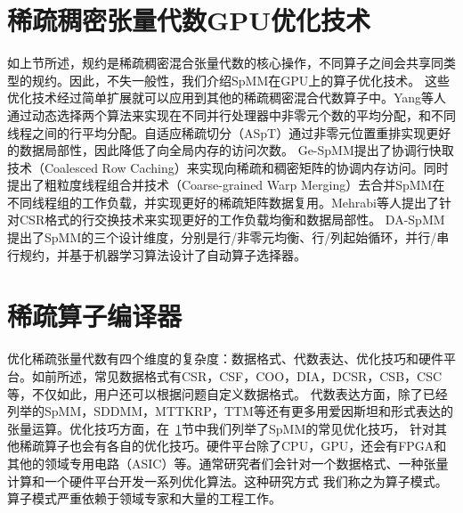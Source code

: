 \section{稀疏稠密张量代数GPU优化技术}\label{sec:spmmopt}
如上节所述，规约是稀疏稠密混合张量代数的核心操作，不同算子之间会共享同类型的规约。因此，不失一般性，我们介绍SpMM在GPU上的算子优化技术。
这些优化技术经过简单扩展就可以应用到其他的稀疏稠密混合代数算子中。Yang等人\cite{yang2018design}通过动态选择两个算法来实现在不同并行处理器中非零元个数的平均分配，和不同线程之间的行平均分配。自适应稀疏切分（ASpT）\cite{hong2019adaptive}通过非零元位置重排实现更好的数据局部性，因此降低了向全局内存的访问次数。
Ge-SpMM\cite{huang2020ge}提出了协调行快取技术（Coalesced Row Caching）来实现向稀疏和稠密矩阵的协调内存访问。同时提出了粗粒度线程组合并技术（Coarse-grained Warp Merging）去合并SpMM在不同线程组的工作负载，并实现更好的稀疏矩阵数据复用。Mehrabi等人\cite{mehrabi2021learning}提出了针对CSR格式的行交换技术来实现更好的工作负载均衡和数据局部性。
DA-SpMM\cite{dai2022heuristic}提出了SpMM的三个设计维度，分别是行/非零元均衡、行/列起始循环，并行/串行规约，并基于机器学习算法设计了自动算子选择器。

\section{稀疏算子编译器}
优化稀疏张量代数有四个维度的复杂度：数据格式、代数表达、优化技巧和硬件平台。如前所述，常见数据格式有CSR，CSF，COO，DIA，DCSR，CSB，CSC等，不仅如此，用户还可以根据问题自定义数据格式。
代数表达方面，除了已经列举的SpMM，SDDMM，MTTKRP，TTM等还有更多用爱因斯坦和\cite{einsteinsum}形式表达的张量运算。优化技巧方面，在~\ref{sec:spmmopt}节中我们列举了SpMM的常见优化技巧，
针对其他稀疏算子也会有各自的优化技巧。硬件平台除了CPU，GPU，还会有FPGA和其他的领域专用电路（ASIC）等。通常研究者们会针对一个数据格式、一种张量计算和一个硬件平台开发一系列优化算法。这种研究方式
我们称之为算子模式。算子模式严重依赖于领域专家和大量的工程工作\cite{wang2014mkl,naumov2010cusparse,guennebaud2010eigen}。

